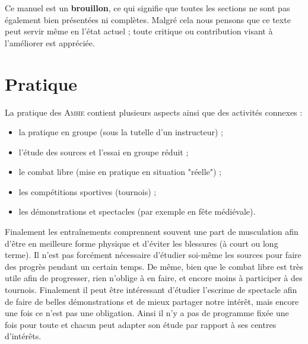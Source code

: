 Ce manuel est un \textbf{brouillon}, ce qui signifie que toutes les sections ne sont pas également bien présentées ni complètes.
Malgré cela nous pensons que ce texte peut servir même en l'état actuel ; toute critique ou contribution visant à l'améliorer est appréciée.





\section{Pratique}


\noindent
La pratique des \textsc{Amhe} contient plusieurs aspects ainsi que des activités connexes :
\begin{itemize}
	\item la pratique en groupe (sous la tutelle d'un instructeur) ;
	\item l'étude des sources et l'essai en groupe réduit ;
	\item le combat libre (mise en pratique en situation "réelle") ;
	\item les compétitions sportives (tournois) ;
	\item les démonstrations et spectacles (par exemple en fête médiévale).
\end{itemize}
Finalement les entraînements comprennent souvent une part de musculation afin d'être en meilleure forme physique et d'éviter les blessures (à court ou long terme).
Il n'est pas forcément nécessaire d'étudier soi-même les sources pour faire des progrès pendant un certain temps.
De même, bien que le combat libre est très utile afin de progresser, rien n'oblige à en faire, et encore moins à participer à des tournois.
Finalement il peut être intéressant d'étudier l'escrime de spectacle afin de faire de belles démonstrations et de mieux partager notre intérêt, mais encore une fois ce n'est pas une obligation.
Ainsi il n'y a pas de programme fixée une fois pour toute et chacun peut adapter son étude par rapport à ses centres d'intérêts.


